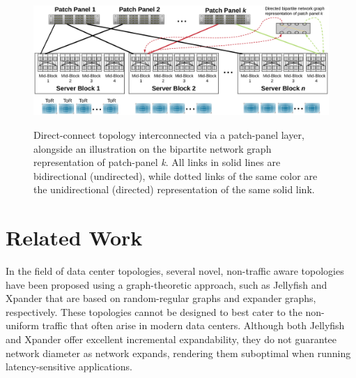 \documentclass[sigconf]{acmart}
\begin{document}
\begin{figure}[h]
\centering
\includegraphics[width=\textwidth, scale=0.55]{./figures/topology.eps}\label{direct_connect_topology}
\caption{Direct-connect topology interconnected via a patch-panel layer, alongside an illustration on the bipartite network graph representation of patch-panel \textit{k}. All links in solid lines are bidirectional (undirected), while dotted links of the same color are the unidirectional (directed) representation of the same solid link.}
\end{figure}

\section{Related Work}

In the field of data center topologies, several novel, non-traffic aware topologies have been proposed using a graph-theoretic approach, such as Jellyfish \cite{singla2012jellyfish} and Xpander \cite{valadarsky2015xpander} that are based on random-regular graphs and expander graphs, respectively. These topologies cannot be designed to best cater to the non-uniform traffic that often arise in modern data centers. Although both Jellyfish and Xpander offer excellent incremental expandability, they do not guarantee network diameter as network expands, rendering them suboptimal when running latency-sensitive applications. 
\end{document}
